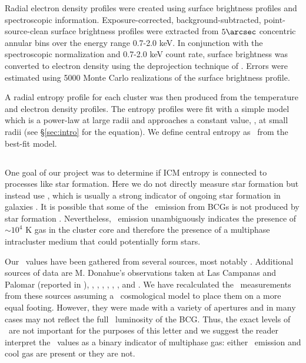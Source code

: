 \documentclass{emulateapj}
\begin{document}
Radial electron density profiles were created using surface brightness
profiles and spectroscopic information. Exposure-corrected,
background-subtracted, point-source-clean surface brightness profiles
were extracted from $5\arcsec$ concentric annular bins over the energy
range 0.7-2.0 keV. In conjunction with the spectroscopic normalization
and 0.7-2.0 keV count rate, surface brightness was converted to
electron density using the deprojection technique of
\cite{kriss83}. Errors were estimated using 5000 Monte Carlo
realizations of the surface brightness profile.

A radial entropy profile for each cluster was then produced from the
temperature and electron density profiles. The entropy profiles were
fit with a simple model which is a power-law at large radii and
approaches a constant value, \kna, at small radii (see
\S\ref{sec:intro} for the equation). We define central entropy as
\kna\ from the best-fit model.

\subsection{\halpha}
\label{sec:ha}

One goal of our project was to determine if ICM entropy is connected
to processes like star formation. Here we do not directly measure star
formation but instead use \halpha, which is usually a strong indicator
of ongoing star formation in galaxies \citep{kennicuttrelation}. It is
possible that some of the \halpha\ emission from BCGs is not produced
by star formation \citep{begelman90, sparks04, rusz08,
 ferland08}. Nevertheless, \halpha\ emission unambiguously indicates
the presence of $\sim 10^4$ K gas in the cluster core and therefore
the presence of a multiphase intracluster medium that could
potentially form stars.

Our \halpha\ values have been gathered from several sources, most
notably \cite{crawford99}. Additional sources of data are M. Donahue's
observations taken at Las Campanas and Palomar (reported in
\citealt{accept}), \cite{heckman89}, \cite{dsg92}, \cite{lawrence96},
\cite{1996AJ....112.1390V}, \cite{white97},
\cite{2005MNRAS.363..216C}, and \cite{ir_quillen}. We have
recalculated the \halpha\ measurements from these sources assuming a
\LCDM\ cosmological model to place them on a more equal footing.
However, they were made with a variety of apertures and in many cases
may not reflect the full \halpha\ luminosity of the BCG. Thus, the
exact levels of \lha\ are not important for the purposes of this
letter and we suggest the reader interpret the \lha\ values as a
binary indicator of multiphase gas: either \halpha\ emission and cool
gas are present or they are not.
\end{document}
